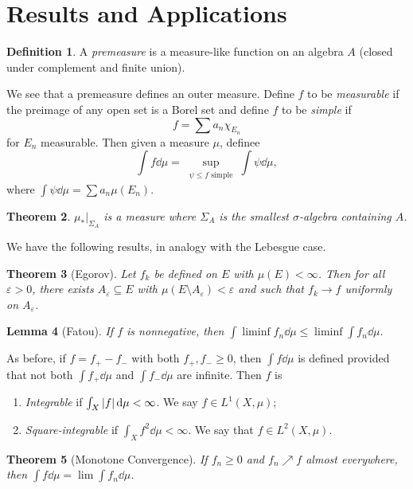\documentclass[leqno, openany]{memoir}
\newtheorem{thm}{Theorem}[chapter]
\newtheorem{lem}[thm]{Lemma}
\theoremstyle{definition}
\newtheorem{defn}[thm]{Definition}
\theoremstyle{remark}
\theoremstyle{plain}
\theoremstyle{definition}
\theoremstyle{remark}
\newcommand{\ep}{\varepsilon}
\begin{document}
\section{Results and Applications}%
\label{sec:results_and_applications}

\begin{defn}
    A \textit{premeasure} is a measure-like function on an algebra $A$ (closed under complement and finite union).
\end{defn}

We see that a premeasure defines an outer measure. Define $f$ to be \textit{measurable} if the preimage of any open set is a Borel set and define $f$ to be \textit{simple} if
\[ f = \sum a_n \chi_{E_n} \]
for $E_n$ measurable. Then given a measure $\mu$, definee
\[ \int f \dd{\mu} = \sup_{\substack{\psi \leq f \text{ simple}}} \int \psi \dd{\mu}, \]
where $\int \psi \dd{\mu} = \sum a_n \mu(E_n)$.

\begin{thm}
    $\mu_* |_{\Sigma_A}$ is a measure where $\Sigma_A$ is the smallest $\sigma$-algebra containing $A$.
\end{thm}

We have the following results, in analogy with the Lebesgue case.

\begin{thm}[Egorov]
    Let $f_k$ be defined on $E$ with $\mu(E) < \infty$. Then for all $\ep > 0$, there exists $A_{\ep} \subseteq E$ with $\mu(E \setminus A_{\ep}) < \ep$ and such that $f_k \to f$ uniformly on $A_{\ep}$.
\end{thm}

\begin{lem}[Fatou]
    If $f$ is nonnegative, then $\int \liminf f_n \dd{\mu} \leq \liminf \int f_n \dd{\mu}$.
\end{lem}

As before, if $f = f_+ - f_-$ with both $f_+, f_- \geq 0$, then $\int f \dd{\mu}$ is defined provided that not both $\int f_+ \dd{\mu}$ and $\int f_- \dd{\mu}$ are infinite. Then $f$ is
\begin{enumerate}
    \item \textit{Integrable} if $\int_X \abs{f} \dd{\mu} < \infty$. We say $f \in L^1(X, \mu)$;
    \item \textit{Square-integrable} if $\int_X f^2 \dd{\mu} < \infty$. We say that $f \in L^2(X, \mu)$.
\end{enumerate}

\begin{thm}[Monotone Convergence]
    If $f_n \geq 0$ and $f_n \nearrow f$ almost everywhere, then $\int f \dd{\mu} = \lim \int f_n \dd{\mu}$.
\end{thm}
\end{document}
